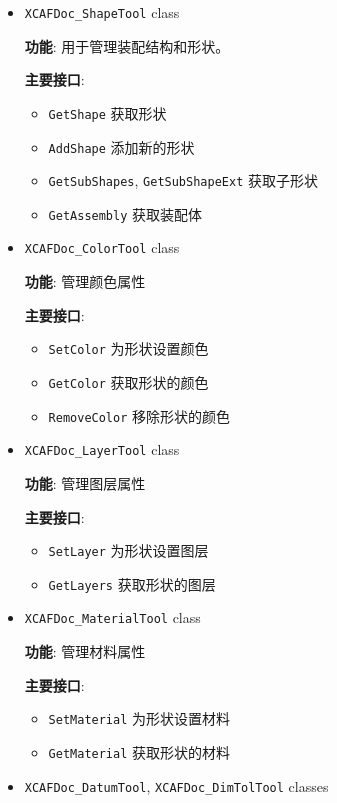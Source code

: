 \documentclass[11pt]{article}
\begin{document}
\begin{itemize}
\item \texttt{XCAFDoc\_ShapeTool} class

\textbf{功能}: 用于管理装配结构和形状。

\textbf{主要接口}:

\begin{itemize}
\item \texttt{GetShape} 获取形状
\item \texttt{AddShape} 添加新的形状
\item \texttt{GetSubShapes}, \texttt{GetSubShapeExt} 获取子形状
\item \texttt{GetAssembly} 获取装配体
\end{itemize}

\item \texttt{XCAFDoc\_ColorTool} class

\textbf{功能}: 管理颜色属性

\textbf{主要接口}:

\begin{itemize}
\item \texttt{SetColor} 为形状设置颜色
\item \texttt{GetColor} 获取形状的颜色
\item \texttt{RemoveColor} 移除形状的颜色
\end{itemize}

\item \texttt{XCAFDoc\_LayerTool} class

\textbf{功能}: 管理图层属性

\textbf{主要接口}:

\begin{itemize}
\item \texttt{SetLayer} 为形状设置图层
\item \texttt{GetLayers} 获取形状的图层
\end{itemize}

\item \texttt{XCAFDoc\_MaterialTool} class

\textbf{功能}: 管理材料属性

\textbf{主要接口}:

\begin{itemize}
\item \texttt{SetMaterial} 为形状设置材料
\item \texttt{GetMaterial} 获取形状的材料
\end{itemize}

\item \texttt{XCAFDoc\_DatumTool}, \texttt{XCAFDoc\_DimTolTool} classes


\end{itemize}
\end{document}
